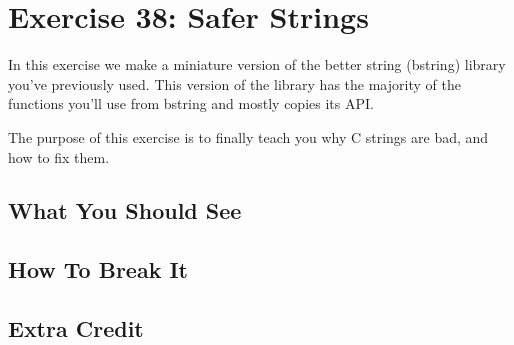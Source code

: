 \chapter{Exercise 38: Safer Strings}

In this exercise we make a miniature version of the better string (bstring) library 
you've previously used.  This version of the library has the majority of the 
functions you'll use from bstring and mostly copies its API.

The purpose of this exercise is to finally teach you why C strings are bad,
and how to fix them.

\section{What You Should See}


\section{How To Break It}


\section{Extra Credit}



